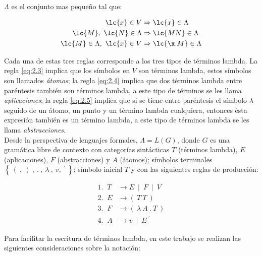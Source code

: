 \(\Lambda\) es el conjunto mas pequeño tal que:

\begin{align}
  \label{eq:2.3}
  \lc{x} \in V &\Rightarrow \lc{x} \in \Lambda\\
  \label{eq:2.4}
  \lc{M},\ \lc{N} \in \Lambda &\Rightarrow \lc{M N} \in \Lambda\\
  \label{eq:2.5}
  \lc{M} \in \Lambda,\ \lc{x} \in V &\Rightarrow \lc{\x.M} \in \Lambda
\end{align}

Cada una de estas tres reglas corresponde a los tres tipos de términos lambda.
La regla \eqref{eq:2.3} implica que los símbolos en \(V\) son términos lambda,
estos símbolos son llamados \emph{átomos}; la regla \eqref{eq:2.4} implica que dos
términos lambda entre paréntesis también son términos lambda, a este tipo de
términos se les llama \emph{aplicaciones}; la regla \eqref{eq:2.5} implica que
si se tiene entre paréntesis el símbolo \(\lambda\) seguido de un átomo, un
punto y un término lambda cualquiera, entonces ésta expresión también es un
término lambda, a este tipo de términos lambda se les llama
\emph{abstracciones}.\\

Desde la perspectiva de lenguajes formales, \(\Lambda = L(G)\), donde \(G\) es
una gramática libre de contexto con categorías sintácticas \(T\) (términos
lambda), \(E\) (aplicaciones), \(F\) (abstracciones) y \(A\) (átomos); símbolos
terminales \(\left\{\ (\ ,\ )\ ,\ .\ ,\ \lambda\ ,\ v,\ {}^{\prime}\
\right\}\); símbolo inicial \(T\) y con las siguientes reglas de producción:

\begin{align*}
  \text{1.  }\ T &\rightarrow  E\ \mid\ F\ \mid\ V\\
  \text{2.  }\ E &\rightarrow  (\ T\ T\ )\\
  \text{3.  }\ F &\rightarrow  (\ \lambda\ A\ .\ T\ )\\
  \text{4.  }\ A &\rightarrow  v\ \mid\ E\ {}^{\prime}
\end{align*}

Para facilitar la escritura de términos lambda, en este trabajo se realizan las
siguientes consideraciones sobre la notación:

